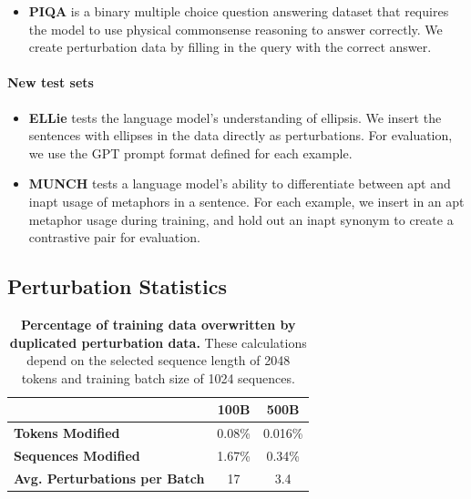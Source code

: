 \begin{itemize}
    \item {} \textbf{PIQA} \citep{Bisk_Zellers_Lebras_Gao_Choi_2020} is a binary multiple choice question answering dataset that requires the model to use physical commonsense reasoning to answer correctly. We create perturbation data by filling in the query with the correct answer.
\end{itemize}

\paragraph{New test sets}

\begin{itemize}
    \item {} \textbf{ELLie} \citep{testa-etal-2023-understand} tests the language model's understanding of ellipsis. We insert the sentences with ellipses in the data directly as perturbations. For evaluation, we use the GPT prompt format defined for each example.
    \item {} \textbf{MUNCH} \citep{tong-etal-2024-metaphor} tests a language model's ability to differentiate between apt and inapt usage of metaphors in a sentence. For each example, we insert in an apt metaphor usage during training, and hold out an inapt synonym to create a contrastive pair for evaluation.
\end{itemize}

\subsection{Perturbation Statistics}
\label{app:perturbation-data-statistics}

\begin{table}[h]
    \centering
    \caption{\textbf{Percentage of training data overwritten by duplicated perturbation data.} These calculations depend on the selected sequence length of 2048 tokens and training batch size of 1024 sequences.}
    \label{tab:perturbation-data-stats}
    \begin{tabular}{lcc}
        \toprule
        & \textbf{100B} & \textbf{500B} \\
        \midrule
        \textbf{Tokens Modified} & 0.08\% & 0.016\% \\
        \textbf{Sequences Modified} & 1.67\% & 0.34\% \\
        \textbf{Avg. Perturbations per Batch} & 17 & 3.4 \\
        \bottomrule
    \end{tabular}
\end{table}

